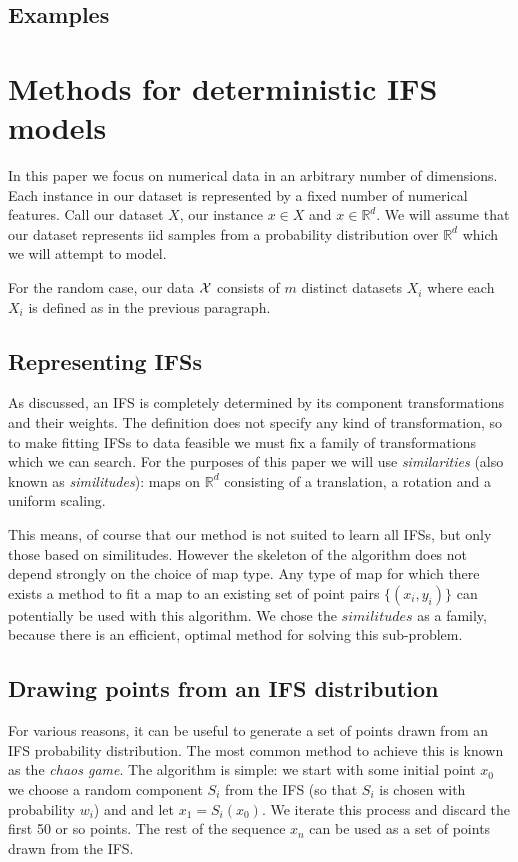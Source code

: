 \documentclass[10pt,a4paper,oneside]{article}
\theoremstyle{definition}
\begin{document}
\subsection*{Examples}

\section*{Methods for deterministic IFS models}

In this paper we focus on numerical data in an arbitrary number of dimensions. Each instance in our dataset is represented by a fixed number of numerical features. Call our dataset $X$, our instance $x \in X$ and $x \in {\mathbb R}^d$. We will assume that our dataset represents iid samples from a probability distribution over ${\mathbb R}^d$ which we will attempt to model.

For the random case, our data ${\cal X}$ consists of $m$ distinct datasets ${X_i}$ where each $X_i$ is defined as in the previous paragraph.

\subsection*{Representing IFSs}

As discussed, an IFS is completely determined by its component transformations and their weights. The definition does not specify any kind of transformation, so to make fitting IFSs to data feasible we must fix a family of transformations which we can search. For the purposes of this paper we will use \emph{similarities} (also known as \emph{similitudes}): maps on ${\mathbb R}^d$ consisting of a translation, a rotation and a uniform scaling.

This means, of course that our method is not suited to learn all IFSs, but only those based on similitudes. However the skeleton of the algorithm does not depend strongly on the choice of map type. Any type of map for which there exists a method to fit a map to an existing set of point pairs $\{(x_i, y_i)\}$ can potentially be used with this algorithm. We chose the $similitudes$ as a family, because there is an efficient, optimal method for solving this sub-problem.

\subsection*{Drawing points from an IFS distribution}

For various reasons, it can be useful to generate a set of points drawn from an IFS probability distribution. The most common method to achieve this is known as the \emph{chaos game}. The algorithm is simple: we start with some initial point $x_0$ we choose a random component $S_i$ from the IFS (so that $S_i$ is chosen with probability $w_i$) and and let $x_1 = S_i(x_0)$. We iterate this process and discard the first 50 or so points. The rest of the sequence $x_n$ can be used as a set of points drawn from the IFS.
\end{document}
